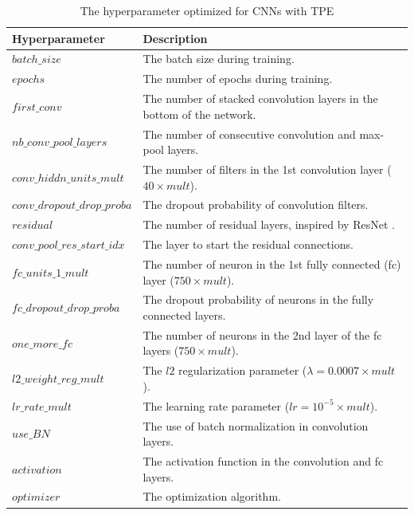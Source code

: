 \documentclass{article}
\begin{document}
\begin{table}[ht]
\caption{The hyperparameter optimized for CNNs with TPE}
\vskip 0.15in
\begin{center}
\begin{small}
    \begin{tabular}{ll}
      \textbf{Hyperparameter} & \textbf{Description} \\
      \hline
      $batch\_size$ & The batch size during training. \\
      $epochs$ & The number of epochs during training.  \\
      $first\_conv$ & The number of stacked convolution layers in the bottom of the network. \\
      $nb\_conv\_pool\_layers$ & The number of consecutive convolution and max-pool layers. \\
      $conv\_hiddn\_units\_mult$ & The number of filters in the 1st convolution layer ($40 \times mult$). \\
      $conv\_dropout\_drop\_proba$ &  The dropout probability of convolution filters. \\
      $residual$ & The number of residual layers, inspired by ResNet \cite{resnet}. \\
      $conv\_pool\_res\_start\_idx$ & The layer to start the residual connections. \\
      $fc\_units\_1\_mult$ & The number of neuron in the 1st fully connected (fc) layer ($750 \times mult$). \\
      $fc\_dropout\_drop\_proba$ & The dropout probability of neurons in the fully connected layers. \\
      $one\_more\_fc$ & The number of neurons in the 2nd layer of the fc layers ($750 \times mult$). \\
      $l2\_weight\_reg\_mult$ & The $l2$ regularization parameter ($\lambda = 0.0007 \times mult$). \\
      $lr\_rate\_mult$ & The learning rate parameter ($lr = 10 ^ {-5} \times mult$). \\
      $use\_BN$ & The use of batch normalization in convolution layers. \\
      $activation$ & The activation function in the convolution and fc layers. \\
      $optimizer$ & The optimization algorithm.
    \end{tabular}
\end{small}
\end{center}
\vskip -0.1in
\label{tab:tpe_var_Model}
\end{table}
\end{document}
